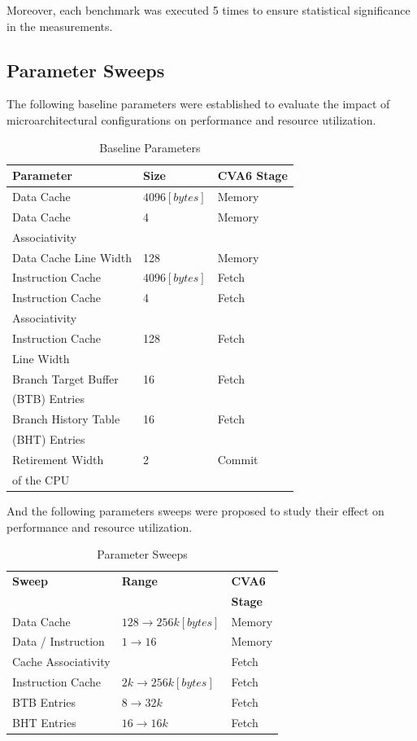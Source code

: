 \documentclass[preprint]{sigplanconf}
\begin{document}
Moreover, each benchmark was executed 5 times to ensure statistical significance in the measurements.
\subsection{Parameter Sweeps}
\label{sec:org84e0534}

The following baseline parameters were established to evaluate the impact of microarchitectural configurations on performance and resource utilization.

\begin{table}[htbp]
\caption{\label{tab:org73ba2c7}Baseline Parameters}
\centering
\begin{tabular*}{\columnwidth}{@{\extracolsep{\fill}}lll}
\hline
\textbf{Parameter} & \textbf{Size} & \textbf{CVA6 Stage}\\
\hline
Data Cache & \(4096[bytes]\) & Memory\\
\hline
Data Cache & 4 & Memory\\
Associativity &  & \\
\hline
Data Cache Line Width & 128 & Memory\\
\hline
Instruction Cache & \(4096[bytes]\) & Fetch\\
\hline
Instruction Cache & 4 & Fetch\\
Associativity &  & \\
\hline
Instruction Cache & 128 & Fetch\\
Line Width &  & \\
\hline
Branch Target Buffer & 16 & Fetch\\
(BTB) Entries &  & \\
\hline
Branch History Table & 16 & Fetch\\
(BHT) Entries &  & \\
\hline
Retirement Width & 2 & Commit\\
of the CPU &  & \\
\hline
\end{tabular*}
\end{table}

And the following parameters sweeps were proposed to study their effect on performance and resource utilization.

\begin{table}[htbp]
\caption{\label{tab:org06386f0}Parameter Sweeps}
\centering
\begin{tabular*}{\columnwidth}{@{\extracolsep{\fill}}lll}
\hline
\textbf{Sweep} & \textbf{Range} & \textbf{CVA6}\\
 &  & \textbf{Stage}\\
\hline
Data Cache & \(128\to256k[bytes]\) & Memory\\
\hline
Data / Instruction & \(1\to16\) & Memory\\
Cache Associativity &  & Fetch\\
\hline
Instruction Cache & \(2k\to256k[bytes]\) & Fetch\\
\hline
BTB Entries & \(8\to32k\) & Fetch\\
\hline
BHT Entries & \(16\to16k\) & Fetch\\
\hline
\end{tabular*}
\end{table}
\end{document}
